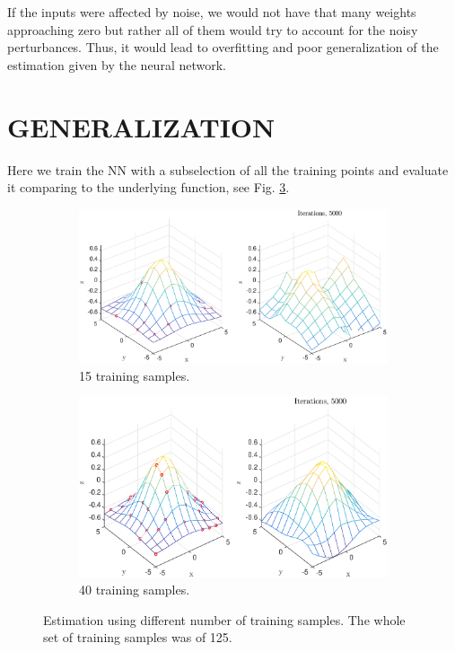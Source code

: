 \documentclass[letterpaper, 10 pt, conference]{ieeeconf}  %
\begin{document}
If the inputs were affected by noise, we would not have that many weights approaching zero but rather all of them would try to account for the noisy perturbances. Thus, it would lead to overfitting and poor generalization of the estimation given by the neural network.

\section{GENERALIZATION}
Here we train the NN with a subselection of all the training points and evaluate it comparing to the underlying function, see Fig. \ref{f:5}.

\begin{figure}[h]
    \centering
    \begin{subfigure}[b]{0.45\textwidth}
        \includegraphics[width=\textwidth]{gene_15}
        \caption{15 training samples.}
        \label{fig:41}
    \end{subfigure}

    \begin{subfigure}[b]{0.45\textwidth}
        \includegraphics[width=\textwidth]{gene_40}
        \caption{40 training samples.}
        \label{fig:42}
    \end{subfigure}
    \caption{Estimation using different number of training samples. The whole set of training samples was of 125.}
    \label{f:5}
\end{figure}
\end{document}
